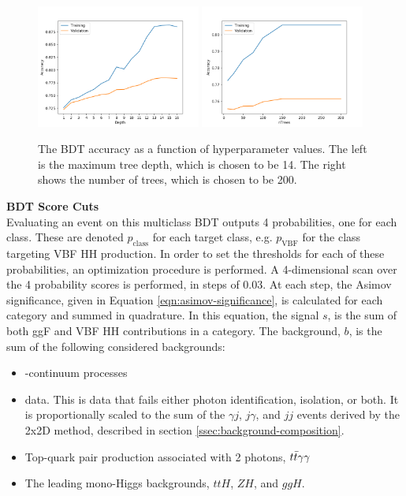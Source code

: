\begin{figure}[!h]
  \centering
  \includegraphics[width=0.48\textwidth]{chapters/chapter6_vbf/images/hp_opt/multiclass_optimized_depth.png}
  \includegraphics[width=0.48\textwidth]{chapters/chapter6_vbf/images/hp_opt/multiclass_optimized_trees.png}
  \caption[The \gls{BDT} accuracy as a function of hyperparameter values]{The \gls{BDT} accuracy as a function of hyperparameter values. The left is the maximum tree depth, which is chosen to be 14. The right shows the number of trees, which is chosen to be 200.}
  \label{fig:hp-opt}
\end{figure}

\noindent\textbf{BDT Score Cuts}\\
\indent Evaluating an event on this multiclass \gls{BDT} outputs 4 probabilities, one for each class. These are denoted $p_{\text{class}}$ for each target class, e.g. $p_{\text{VBF}}$ for the class targeting VBF HH production. In order to set the thresholds for each of these probabilities, an optimization procedure is performed. A 4-dimensional scan over the 4 probability scores is performed, in steps of 0.03. At each step, the Asimov significance, given in Equation \ref{eqn:asimov-significance}, is calculated for each category and summed in quadrature. In this equation, the signal $s$, is the sum of both ggF and VBF HH contributions in a category. The background, $b$, is the sum of the following considered backgrounds:
\begin{itemize}
  \item \yy-continuum processes
  \item {} data. This is data that fails either photon identification, isolation, or both. It is proportionally scaled to the sum of the $\gamma j$, $j \gamma$, and $jj$ events derived by the 2x2D method, described in section \ref{ssec:background-composition}.
  \item Top-quark pair production associated with 2 photons, $t\bar{t}\gamma\gamma$
  \item The leading mono-Higgs backgrounds, $ttH$, $ZH$, and $ggH$.
\end{itemize}

